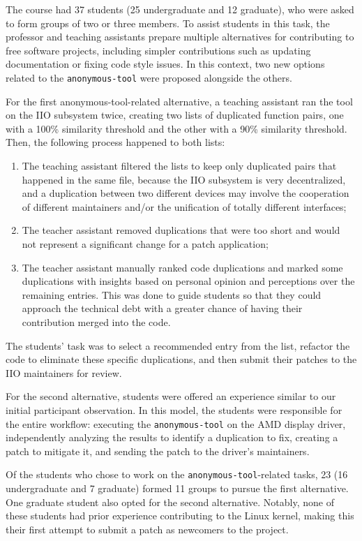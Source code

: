 \documentclass[10pt,conference]{IEEEtran}
\begin{document}
The course had 37 students (25 undergraduate and 12 graduate), who were asked to form groups of 
two or three members. To assist students in this task, the professor and teaching assistants prepare multiple 
alternatives for contributing to free software projects, including simpler contributions such as 
updating documentation or fixing code style issues. In this context, two new options related to the 
\texttt{anonymous-tool} were proposed alongside the others.

For the first anonymous-tool-related alternative, a teaching assistant ran the tool on the IIO subsystem twice, creating two lists of duplicated function pairs, one with a 100\% similarity threshold and the other with a 90\% similarity threshold. Then, the following process happened to both lists:

\begin{enumerate}
    \item The teaching assistant filtered the lists to keep only duplicated pairs that happened in the same file, because the IIO subsystem is very decentralized, and a duplication between two different devices may involve the cooperation of different maintainers and/or the unification of totally different interfaces;
    \item The teacher assistant removed duplications that were too short and would not represent a significant change for a patch application;
    \item The teacher assistant manually ranked code duplications and marked some duplications with insights based on personal opinion and perceptions over the remaining entries. This was done to guide students so that they could approach the technical debt with a greater chance of having their contribution merged into the code.
\end{enumerate}

The students' task was to select a recommended entry from the list, refactor the code to eliminate these specific duplications, and then submit their patches to the IIO maintainers for review.

For the second alternative, students were offered an experience similar to our initial participant 
observation. In this model, the students were responsible for the entire workflow: executing the 
\texttt{anonymous-tool} on the AMD display driver, independently analyzing the results to identify a duplication 
to fix, creating a patch to mitigate it, and sending the patch to the driver's maintainers.

Of the students who chose to work on the \texttt{anonymous-tool}-related tasks, 23 (16 undergraduate and 7 graduate) 
formed 11 groups to pursue the first alternative. One graduate student also opted for the second alternative. Notably, none of these students had prior experience contributing to the Linux kernel, making this their first attempt to submit a patch as newcomers to the project.
\end{document}
